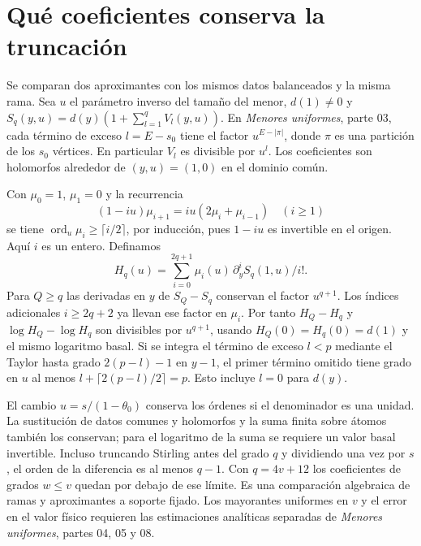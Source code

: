 \section{Qué coeficientes conserva la truncación}
Se comparan dos aproximantes con los mismos datos balanceados y la misma rama.
Sea $u$ el parámetro inverso del tamaño del menor, $d(1)\ne0$ y
$S_q(y,u)=d(y)(1+\sum_{l=1}^q V_l(y,u))$. En \emph{Menores uniformes}, parte 03,
cada término de exceso $l=E-s_0$ tiene el factor $u^{E-|\pi|}$, donde $\pi$
es una partición de los $s_0$ vértices. En particular $V_l$ es divisible por $u^l$.
Los coeficientes son holomorfos alrededor de $(y,u)=(1,0)$ en el dominio común.

Con $\mu_0=1$, $\mu_1=0$ y la recurrencia
\[
 (1-iu)\mu_{i+1}=iu(2\mu_i+\mu_{i-1})\quad(i\ge1)
\]
se tiene $\operatorname{ord}_u\mu_i\ge\lceil i/2\rceil$, por inducción,
pues $1-iu$ es invertible en el origen. Aquí $i$ es un entero. Definamos
\[
 H_q(u)=\sum_{i=0}^{2q+1}\mu_i(u)\,\partial_y^i S_q(1,u)/i!.
\]
Para $Q\ge q$ las derivadas en $y$ de $S_Q-S_q$ conservan el factor $u^{q+1}$.
Los índices adicionales $i\ge2q+2$ ya llevan ese factor en $\mu_i$.
Por tanto $H_Q-H_q$ y $\log H_Q-\log H_q$ son divisibles por $u^{q+1}$,
usando $H_Q(0)=H_q(0)=d(1)$ y el mismo logaritmo basal.
Si se integra el término de exceso $l<p$ mediante el Taylor hasta grado
$2(p-l)-1$ en $y-1$, el primer término omitido tiene grado en $u$ al menos
$l+\lceil 2(p-l)/2\rceil=p$. Esto incluye $l=0$ para $d(y)$.

El cambio $u=s/(1-\theta_0)$ conserva los órdenes si el denominador es una unidad.
La sustitución de datos comunes y holomorfos y la suma finita sobre átomos también
los conservan; para el logaritmo de la suma se requiere un valor basal invertible.
Incluso truncando Stirling antes del grado $q$ y dividiendo una vez por $s$,
el orden de la diferencia es al menos $q-1$. Con $q=4v+12$ los coeficientes
de grados $w\le v$ quedan por debajo de ese límite.
Es una comparación algebraica de ramas y aproximantes a soporte fijado.
Los mayorantes uniformes en $v$ y el error en el valor físico requieren
las estimaciones analíticas separadas de \emph{Menores uniformes}, partes 04, 05 y 08.
